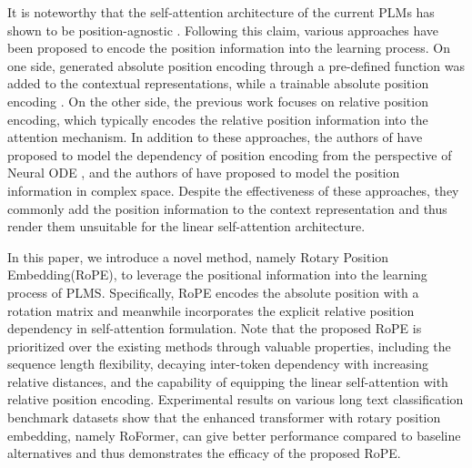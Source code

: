 \documentclass{article}
\begin{document}
It is noteworthy that the self-attention architecture of the current PLMs has shown to be position-agnostic \cite{Yun2020Are}. Following this claim, various approaches have been proposed to encode the position information into the learning process. On one side, generated absolute position encoding through a pre-defined function \cite{Vaswani:2017} was added to the contextual representations, while a trainable absolute position encoding \cite{Gehring:2017,Devlin2019BERTPO,Lan2020ALBERT:2020,clark2020electra,Radford2019LanguageMA,Radford2018ImprovingLU:2018}. On the other side, the previous work \cite{Parikh2016ADA,Shaw2018SelfAttentionWR,Huang2018MusicT,Dai2019TransformerXLAL,Yang2019XLNetGA,Raffel2020ExploringTL,Ke2020RethinkingPE,He2020DeBERTaDB,huang-etal-2020-improve} focuses on relative position encoding, which typically encodes the relative position information into the attention mechanism. In addition to these approaches, the authors of \cite{LiuYDH:2020} have proposed to model the dependency of position encoding from the perspective of Neural ODE \cite{ChenRBD:2018}, and the authors of \cite{Wang2020Encoding} have proposed to model the position information in complex space. Despite the effectiveness of these approaches, they commonly add the position information to the context representation and thus render them unsuitable for the linear self-attention architecture.

In this paper, we introduce a novel method, namely Rotary Position Embedding(RoPE), to leverage the positional information into the learning process of PLMS. Specifically, RoPE encodes the absolute position with a rotation matrix and meanwhile incorporates the explicit relative position dependency in self-attention formulation. Note that the proposed RoPE is prioritized over the existing methods through valuable properties, including the sequence length flexibility, decaying inter-token dependency with increasing relative distances, and the capability of equipping the linear self-attention with relative position encoding.
Experimental results on various long text classification benchmark datasets show that the enhanced transformer with rotary position embedding, namely RoFormer, can give better performance compared to baseline alternatives and thus demonstrates the efficacy of the proposed RoPE.
\end{document}

